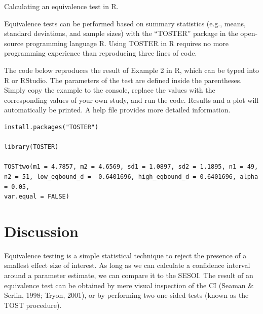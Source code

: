 \documentclass[english,floatsintext,man]{apa6}
\theoremstyle{definition}
\theoremstyle{definition}
\theoremstyle{definition}
\theoremstyle{remark}
\begin{document}
\begin{textbox}
\caption{Calculating an equivalence test in R.}
\begin{framed}
{\sffamily \small {}
Equivalence tests can be performed  based on summary statistics (e.g., means, standard deviations, and sample sizes) with the ``TOSTER'' package in the open-source programming language R. Using TOSTER in R requires no more programming experience than reproducing three lines of code.
\vspace{2mm}

The code below reproduces the result of Example 2 in R, which can be typed into R or RStudio. The parameters of the test are defined inside the parentheses. Simply copy the example to the console, replace the values with the corresponding values of your own study, and run the code. Results and a plot will automatically be printed. A help file provides more detailed information.

\begin{verbatim}
install.packages("TOSTER")

library(TOSTER)

TOSTtwo(m1 = 4.7857, m2 = 4.6569, sd1 = 1.0897, sd2 = 1.1895, n1 = 49,
n2 = 51, low_eqbound_d = -0.6401696, high_eqbound_d = 0.6401696, alpha = 0.05,
var.equal = FALSE)
\end{verbatim}
}
\end{framed}
\end{textbox}

\section{Discussion}\label{discussion}

Equivalence testing is a simple statistical technique to reject the
presence of a smallest effect size of interest. As long as we can
calculate a confidence interval around a parameter estimate, we can
compare it to the SESOI. The result of an equivalence test can be
obtained by mere visual inspection of the CI (Seaman \& Serlin, 1998;
Tryon, 2001), or by performing two one-sided tests (known as the TOST
procedure).
\end{document}
